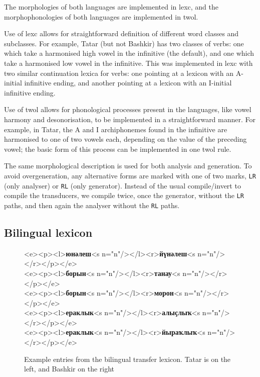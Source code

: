 \documentclass[11pt]{article}
\begin{document}
The morphologies of both languages are implemented in lexc, and the morphophonologies of both languages are implemented in twol.

Use of lexc allows for straightforward definition of different word classes and subclasses.  For example, Tatar (but not Bashkir) has two classes of verbs: one which take a harmonised high vowel in the infinitive (the default), and one which take a harmonised low vowel in the infinitive.  This was implemented in lexc with two similar continuation lexica for verbs: one pointing at a lexicon with an A-initial infinitive ending, and another pointing at a lexicon with an I-initial infinitive ending.

Use of twol allows for phonological processes present in the languages, like vowel harmony and desonorisation, to be implemented in a straightforward manner.  For example, in Tatar, the A and I archiphonemes found in the infinitive are harmonised to one of two vowels each, depending on the value of the preceding vowel; the basic form of this process can be implemented in one twol rule.

The same morphological description is used for both analysis and generation. To avoid overgeneration, any alternative forms are 
marked with one of two marks, {\tt {\small LR}} (only analyser) or {\tt {\small RL}} (only generator). Instead of the usual
compile/invert to compile the transducers, we compile twice, once the generator, without the {\tt {\small LR}} paths, and
then again the analyser without the {\tt {\small RL}} paths. 

\subsection{Bilingual lexicon}
\begin{figure}[htbp]
\begin{texttt}
    <e><p><l>\textbf{юнәлеш}<s n="n"/></l><r>\textbf{йүнәлеш}<s n="n"/></r></p></e> \\
    <e><p><l>\textbf{борын}<s n="n"/></l><r>\textbf{танау}<s n="n"/></r></p></e> \\
    <e><p><l>\textbf{борын}<s n="n"/></l><r>\textbf{морон}<s n="n"/></r></p></e> \\
    <e><p><l>\textbf{ераклык}<s n="n"/></l><r>\textbf{алы{\qipa ҫ}лы{\qipa ҡ}}<s n="n"/></r></p></e> \\
    <e><p><l>\textbf{ераклык}<s n="n"/></l><r>\textbf{йыра{\qipa ҡ}лы{\qipa ҡ}}<s n="n"/></r></p></e>
\end{texttt}
\caption{Example entries from the bilingual transfer lexicon. Tatar is on the left, and Bashkir on the right}
\label{fig:bidix}
\end{figure}
\end{document}
